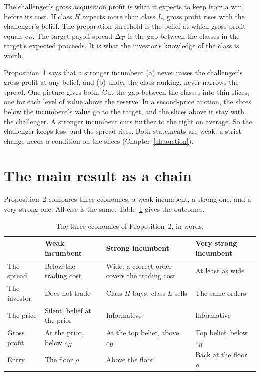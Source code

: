 The challenger's gross acquisition profit is what it expects to keep from a win, before its cost. If class \(H\)
expects more than class \(L\), gross profit rises with the challenger's belief. The preparation threshold is the
belief at which gross profit equals \(c_H\). The target-payoff spread \(\Delta_T\) is the gap between the classes in the
target's expected proceeds. It is what the investor's knowledge of the class is worth.

Proposition~1 says that a stronger incumbent (a) never raises the challenger's gross profit at any belief, and
(b) under the class ranking, never narrows the spread. One picture gives both. Cut the gap between the classes into
thin slices, one for each level of value above the reserve. In a second-price auction, the slices below the
incumbent's value go to the target, and the slices above it stay with the challenger. A stronger incumbent cuts
further to the right on average. So the challenger keeps less, and the spread rises.
Both statements are weak: a strict change needs a condition on the slices (Chapter~\ref{ch:auction}).

\section{The main result as a chain}\label{sec:story-chain}

Proposition~2 compares three economies: a weak incumbent, a strong one, and a very strong one. All else is the same. Table~\ref{tab:story-three} gives the outcomes.

\begin{table}[ht]
\centering\footnotesize
\caption{The three economies of Proposition~2, in words.}\label{tab:story-three}
\begin{tabular}{@{}>{\raggedright\arraybackslash}p{2.3cm}>{\raggedright\arraybackslash}p{3.6cm}>{\raggedright\arraybackslash}p{4.4cm}>{\raggedright\arraybackslash}p{3.6cm}@{}}
\toprule
 & Weak incumbent & Strong incumbent & Very strong incumbent\\
\midrule
The spread & Below the trading cost & Wide: a correct order covers the trading cost & At least as wide\\
The investor & Does not trade & Class \(H\) buys, class \(L\) sells & The same orders\\
The price & Silent: belief at the prior & Informative & Informative\\
Gross profit & At the prior, below \(c_H\) & At the top belief, above \(c_H\) & Top belief, below \(c_H\)\\
Entry & The floor \(\rho\) & Above the floor & Back at the floor \(\rho\)\\
\bottomrule
\end{tabular}
\end{table}

